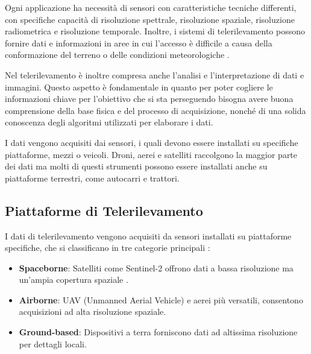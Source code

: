 


Ogni applicazione ha necessità di sensori con caratteristiche tecniche differenti, con 
specifiche capacità di risoluzione spettrale, risoluzione spaziale, risoluzione 
radiometrica e risoluzione temporale. Inoltre, i sistemi di telerilevamento possono 
fornire dati e informazioni in aree in cui l'accesso è difficile a causa della 
conformazione del terreno o delle condizioni meteorologiche \cite{GISGeography_RemoteSensing}.  


Nel telerilevamento è inoltre compresa anche l'analisi e l'interpretazione di dati e 
immagini. Questo aspetto è fondamentale in quanto per poter cogliere le 
informazioni chiave per l’obiettivo che si sta perseguendo bisogna avere buona 
comprensione della base fisica e del processo di acquisizione, nonché di una solida 
conoscenza degli algoritmi utilizzati per elaborare i dati.

I dati vengono acquisiti dai sensori, i quali devono essere installati su specifiche 
piattaforme, mezzi o veicoli. Droni, aerei e satelliti raccolgono la maggior parte dei 
dati ma molti di questi strumenti possono essere installati anche su piattaforme 
terrestri, come autocarri e trattori.  

\subsection{Piattaforme di Telerilevamento}

I dati di telerilevamento vengono acquisiti da sensori installati su 
piattaforme specifiche, che si classificano in tre categorie 
principali \cite{Rappresentazione_piattaforme, Descrizione_Piattaforme}:


\begin{itemize}
    \item \textbf{Spaceborne}: Satelliti come Sentinel-2 offrono dati a bassa risoluzione ma un'ampia copertura spaziale \cite{Munich480}.
    \item \textbf{Airborne}: UAV (Unmanned Aerial Vehicle) e aerei più versatili, consentono acquisizioni ad alta risoluzione spaziale.
    \item \textbf{Ground-based}: Dispositivi a terra forniscono dati ad altissima risoluzione per dettagli locali.
\end{itemize}


